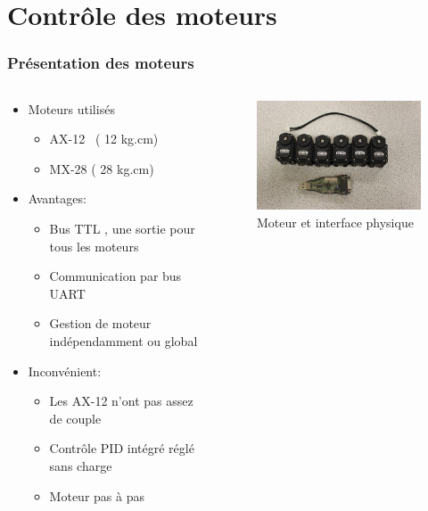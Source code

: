 \section{Contrôle des moteurs}
\begin{frame}
  \frametitle{Présentation des moteurs}
  \begin{columns}[T]
    \begin{column}{.65\textwidth}
           \begin{itemize}
            \item Moteurs utilisés 
            \begin{itemize}
              \item AX-12~ ( 12 kg.cm)
              \item MX-28 ( 28 kg.cm)
            \end{itemize}
            \item Avantages:
            \begin{itemize}
              \item Bus TTL , une sortie pour tous les moteurs
              \item Communication par bus UART
              \item Gestion de moteur indépendamment ou global
            \end{itemize}
          \item Inconvénient:
            \begin{itemize}
              \item Les AX-12 n'ont pas assez de couple
              \item Contrôle PID intégré réglé sans charge
              \item Moteur pas à pas
            \end{itemize}
          \end{itemize}
        \end{column}
        \begin{column}{.3\textwidth}
          \begin{figure}[ht]
            \centering
            \includegraphics[scale= 0.35]{../img/AX12+USB_2_DynamicCell.JPG}
            \caption{Moteur et interface physique}
          \end{figure}
        \end{column}
      \end{columns}

\end{frame}

